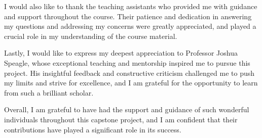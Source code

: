 \documentclass[12pt]{article}
\begin{document}
\noindent
I would also like to thank the teaching assistants who provided me with guidance and support throughout the course. Their patience and dedication in answering my questions and addressing my concerns were greatly appreciated, and played a crucial role in my understanding of the course material.

\noindent
Lastly, I would like to express my deepest appreciation to Professor Joshua Speagle, whose exceptional teaching and mentorship inspired me to pursue this project. His insightful feedback and constructive criticism challenged me to push my limits and strive for excellence, and I am grateful for the opportunity to learn from such a brilliant scholar.

\noindent
Overall, I am grateful to have had the support and guidance of such wonderful individuals throughout this capstone project, and I am confident that their contributions have played a significant role in its success.

\newpage



\end{document}
